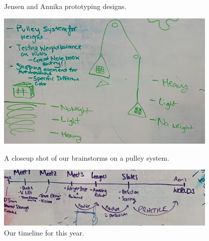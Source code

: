 \begin{figure}[ht]
\begin{minipage}[b]{.48\textwidth}
  \caption{Jensen and Annika prototyping designs.}
  \label{fig:pic6}
\end{minipage}
\end{figure}

\begin{figure}[ht]
\centering
\begin{minipage}[b]{.48\textwidth}
  \centering
  \includegraphics[width=0.95\textwidth]{Meetings/September/09-21-21/9-18-21_Team_Image7 - Nathan Forrer.jpg}
  \caption{A closeup shot of our brainstorms on a pulley system.}
  \label{fig:pic7}
\end{minipage}%
\hfill%
\begin{minipage}[b]{.48\textwidth}
  \centering
  \includegraphics[width=0.95\textwidth]{Meetings/September/09-21-21/9-18-21_Team_Image8 - Nathan Forrer.jpg}
  \caption{Our timeline for this year.}
  \label{fig:pic8}
\end{minipage}
\end{figure}


